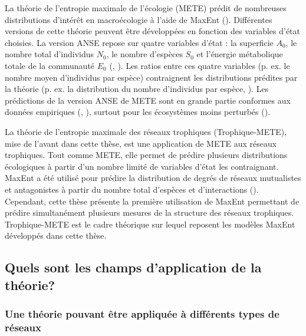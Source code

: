 La théorie de l'entropie maximale de l'écologie (METE) prédit de nombreuses
distributions d'intérêt en macroécologie à l'aide de MaxEnt
(\cite{Harte2011Maximum}). Différentes versions de cette théorie peuvent être
développées en fonction des variables d'état choisies. La version ANSE repose
sur quatre variables d'état : la superficie $A_0$, le nombre total d'individus
$N_0$, le nombre d'espèces $S_0$ et l'énergie métabolique totale de la
communauté $E_0$ (\cite{Harte2008Maximum}, \cite{Harte2014Maximuma}). Les ratios
entre ces quatre variables (p. ex. le nombre moyen d'individus par espèce)
contraignent les distributions prédites par la théorie (p. ex. la distribution
du nombre d'individus par espèce, \cite{Brummer2019Derivations}). Les
prédictions de la version ANSE de METE sont en grande partie conformes aux
données empiriques (\cite{Harte2011Maximum}, \cite{McGlinn2015Exploring}),
surtout pour les écosystèmes moins perturbés (\cite{Newman2020Disturbance}). 

La théorie de l'entropie maximale des réseaux trophiques (Trophique-METE), mise
de l'avant dans cette thèse, est une application de METE aux réseaux trophiques.
Tout comme METE, elle permet de prédire plusieurs distributions écologiques à
partir d'un nombre limité de variables d'état les contraignant. MaxEnt a été
utilisé pour prédire la distribution de degrés de réseaux mutualistes et
antagonistes à partir du nombre total d'espèces et d'interactions
(\cite{Williams2011Biology}). Cependant, cette thèse présente la première
utilisation de MaxEnt permettant de prédire simultanément plusieurs mesures de
la structure des réseaux trophiques. Trophique-METE est le cadre théorique sur
lequel reposent les modèles MaxEnt développés dans cette thèse.

\subsection{Quels sont les champs d'application de la théorie?} 

\subsubsection{Une théorie pouvant être appliquée à différents types de réseaux} 

